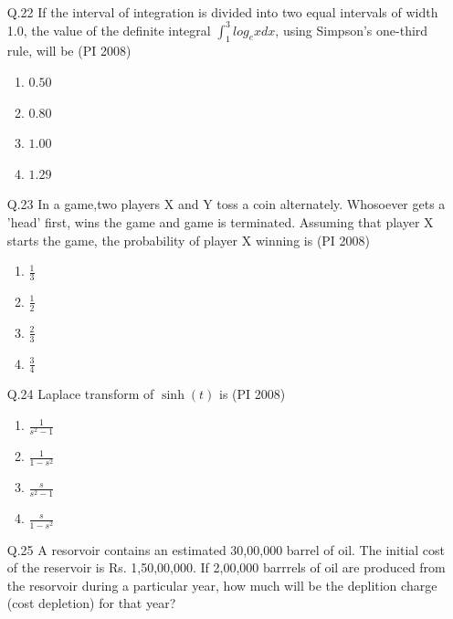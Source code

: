 \documentclass[journal,12pt,onecolumn]{IEEEtran}
\theoremstyle{remark}
\begin{document}
\begin{enumerate}
\[\begin{matrix}
    \end{matrix}\]
    \vspace{1cm}
    \item[\textnormal{Q.22}]  If the interval of integration is divided into two equal intervals of width 1.0, the value of the definite integral $\int_1^3 log_e x dx$, using Simpson's one-third rule, will be
    \hfill{(PI 2008)}
    \begin{multicols}{4}
    \begin{enumerate}[label=(\Alph*)]
        \item $0.50$
        \item $0.80$
        \item $1.00$
        \item $1.29$
    \end{enumerate}
\end{multicols}
\item[\textnormal{Q.23}]  In a game,two players X and Y toss a coin alternately. Whosoever gets a 'head' first, wins the game and game is terminated. Assuming  that player X starts the game, the probability of player X winning is 
    \hfill{(PI 2008)}
    \begin{multicols}{4}
    \begin{enumerate}[label=(\Alph*)]
        \item $\frac{1}{3}$
        \item $\frac{1}{2}$
        \item $\frac{2}{3}$
        \item $\frac{3}{4}$
    \end{enumerate}
\end{multicols}
\item[\textnormal{Q.24}] Laplace transform of $\sinh (t)$ is  
    \hfill{(PI 2008)}
    \begin{multicols}{4}
    \begin{enumerate}[label=(\Alph*)]
        \item $\frac{1}{s^2 -1}$
        \item $\frac{1}{1-s^2}$
        \item $\frac{s}{s^2-1}$
        \item $\frac{s}{1-s^2}$
    \end{enumerate}
\end{multicols}
\item[\textnormal{Q.25}] A resorvoir contains an estimated 30,00,000 barrel of oil. The initial cost of the reservoir is Rs. 1,50,00,000. If 2,00,000 barrrels of oil are produced from the resorvoir during a particular year, how much will be the deplition charge (cost depletion) for that year?  

\end{enumerate}
\end{document}

